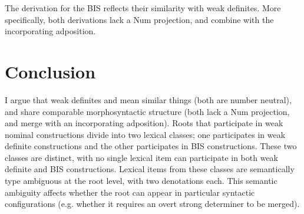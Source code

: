 \documentclass[output=paper,
modfonts
]{langscibook}
\begin{document}
\begin{exe}
\end{exe}

The derivation for the BIS reflects their similarity with weak definites. More specifically, both derivations lack a {Num} projection, and combine with the incorporating adposition. 

\section{Conclusion}\label{sec:williams:6}

I argue that weak definites and  mean similar things (both are number neutral), and share comparable morphosyntactic structure (both lack a {Num} projection, and merge with an incorporating adposition). Roots that participate in weak nominal constructions divide into two lexical classes; one participates in weak definite constructions and the other participates in BIS constructions. These two classes are distinct, with no single lexical item can participate in both weak definite and BIS constructions. Lexical items from these classes are semantically type ambiguous at the root level, with two denotations each. This semantic ambiguity affects whether the root can appear in particular syntactic configurations (e.g. whether it requires an overt strong determiner to be merged).   
\end{document}
